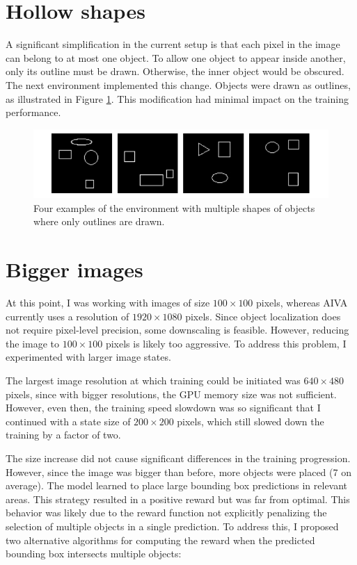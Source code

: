 \documentclass[
  digital,     %
  oneside,     %
  nosansbold,  %
  nocolorbold, %
  lof,         %
  lot,         %
]{fithesis4}
\begin{document}
\section{Hollow shapes}
A significant simplification in the current setup is that each pixel in the image can belong to at most one object. To allow one object to appear inside another, only its outline must be drawn. Otherwise, the inner object would be obscured. The next environment implemented this change. Objects were drawn as outlines, as illustrated in Figure \ref{fig:env5}. This modification had minimal impact on the training performance.

\begin{figure}
    \centering
    \includegraphics[width=1\linewidth]{env_examples/env5.pdf}
    \caption{Four examples of the environment with multiple shapes of objects where only outlines are drawn.}
    \label{fig:env5}
\end{figure}

\section{Bigger images}
At this point, I was working with images of size $100\times100$ pixels, whereas AIVA currently uses a resolution of $1920\times1080$ pixels. Since object localization does not require pixel-level precision, some downscaling is feasible. However, reducing the image to $100\times100$ pixels is likely too aggressive. To address this problem, I experimented with larger image states.

The largest image resolution at which training could be initiated was $640\times480$ pixels, since with bigger resolutions, the GPU memory size was not sufficient. However, even then, the training speed slowdown was so significant that I continued with a state size of $200\times200$ pixels, which still slowed down the training by a factor of two.

The size increase did not cause significant differences in the training progression. However, since the image was bigger than before, more objects were placed (7 on average). The model learned to place large bounding box predictions in relevant areas. This strategy resulted in a positive reward but was far from optimal. This behavior was likely due to the reward function not explicitly penalizing the selection of multiple objects in a single prediction. To address this, I proposed two alternative algorithms for computing the reward when the predicted bounding box intersects multiple objects:
\end{document}
